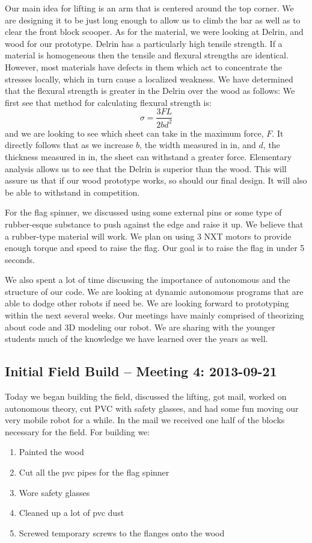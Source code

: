 Our main idea for lifting is an arm that is centered around the top corner. We are designing it to be just long enough to allow us to climb the bar as well as to clear the front block scooper. As for the material, we were looking at Delrin, and wood for our prototype. Delrin has a particularly high tensile strength. If a material is homogeneous then the tensile and flexural strengths are identical. However, most materials have defects in them which act to concentrate the stresses locally, which in turn cause a localized weakness. We have determined that the flexural strength is greater in the Delrin over the wood as follows: We first see that method for calculating flexural strength is: \[\sigma = \frac{3FL}{2bd^2}\] and we are looking to see which sheet can take in the maximum force, $F$. It directly follows that as we increase $b$, the width measured in in, and $d$, the  thickness measured in in, the sheet can withstand a greater force. Elementary analysis allows us to see that the Delrin is superior than the wood. This will assure us that if our wood prototype works, so should our final design. It will also be able to withstand in competition. 

For the flag spinner, we discussed using some external pins or some type of rubber-esque substance to push against the edge and raise it up. We believe that a rubber-type material will work. We plan on using 3 NXT motors to provide enough torque and speed to raise the flag. Our goal is to raise the flag in under 5 seconds. 

We also spent a lot of time discussing the importance of autonomous and the structure of our code. We are looking at dynamic autonomous programs that are able to dodge other robots if need be. We are looking forward to prototyping within the next several weeks. Our meetings have mainly comprised of theorizing about code and 3D modeling our robot. We are sharing with the younger students much of the knowledge we have learned over the years as well. 

\newpage \subsection{Initial Field Build -- Meeting 4: 2013-09-21}
Today we began building the field, discussed the lifting, got mail, worked on autonomous theory, cut PVC with safety glasses, and had some fun moving our very mobile robot for a while.  In the mail we received one half of the blocks necessary for the field.
For building we:
\begin{enumerate}
\item Painted the wood
\item Cut all the pvc pipes for the flag spinner
\item Wore safety glasses
\item Cleaned up a lot of pvc dust
\item Screwed temporary screws to the flanges onto the wood
\end{enumerate}

